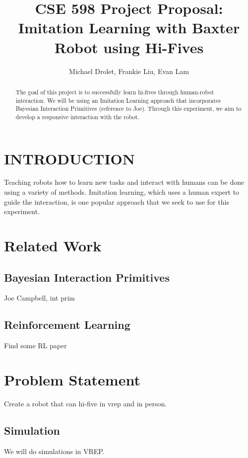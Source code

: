 \documentclass[letterpaper, 10 pt, conference]{ieeeconf}  %
\title{\LARGE \bf
CSE 598 Project Proposal: \\
Imitation Learning with Baxter Robot using Hi-Fives
}
\author{Michael Drolet, Frankie Liu, Evan Lam}
\begin{document}
\maketitle
\thispagestyle{empty}
\pagestyle{empty}


\begin{abstract}

The goal of this project is to successfully learn hi-fives through human-robot interaction. We will be using an Imitation Learning approach that incorporates Bayesian Interaction Primitives (reference to Joe). Through this experiment, we aim to develop a responsive interaction with the robot.

\end{abstract}


\section{INTRODUCTION}
Teaching robots how to learn new tasks and interact with humans can be done using a variety of methods. Imitation learning, which uses a human expert to guide the interaction, is one popular approach that we seek to use for this experiment.


\section{Related Work}

\subsection{Bayesian Interaction Primitives}

Joe Campbell, int prim

\subsection{Reinforcement Learning}

Find some RL paper


\section{Problem Statement}
Create a robot that can hi-five in vrep and in person.

\subsection{Simulation} 
We will do simulations in VREP.
\end{document}
